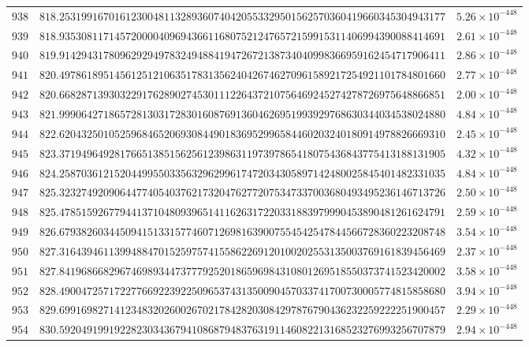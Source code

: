 \documentclass[12pt,reqno]{amsart}
\theoremstyle{remark}
\begin{document}
\begin{longtable}{clc}
$938$ & $818.2531991670161230048113289360740420553329501562570360419660345304943177$ & $5.26\times 10^{-448}$ \\
$939$ & $818.9353081171457200004096943661168075212476572159915311406994390088414691$ & $2.61\times 10^{-448}$ \\
$940$ & $819.9142943178096292949783249488419472672138734040998366959162454717906411$ & $2.86\times 10^{-448}$ \\
$941$ & $820.4978618951456125121063517831356240426746270961589217254921101784801660$ & $2.77\times 10^{-448}$ \\
$942$ & $820.6682871393032291762890274530111226437210756469245274278726975648866851$ & $2.00\times 10^{-448}$ \\
$943$ & $821.9990642718657281303172830160876913604626951993929768630344034538024880$ & $4.84\times 10^{-448}$ \\
$944$ & $822.6204325010525968465206930844901836952996584460203240180914978826669310$ & $2.45\times 10^{-448}$ \\
$945$ & $823.3719496492817665138515625612398631197397865418075436843775413188131905$ & $4.32\times 10^{-448}$ \\
$946$ & $824.2587036121520449955033563296299617472034305897142480025845401482331035$ & $4.84\times 10^{-448}$ \\
$947$ & $825.3232749209064477405403762173204762772075347337003680493495236146713726$ & $2.50\times 10^{-448}$ \\
$948$ & $825.4785159267794413710480939651411626317220331883979990453890481261624791$ & $2.59\times 10^{-448}$ \\
$949$ & $826.6793826034450941513315774607126981639007554542547844566728360223208748$ & $3.54\times 10^{-448}$ \\
$950$ & $827.3164394611399488470152597574155862269120100202553135003769161839456469$ & $2.37\times 10^{-448}$ \\
$951$ & $827.8419686682967469893447377792520186596984310801269518550373741523420002$ & $3.58\times 10^{-448}$ \\
$952$ & $828.4900472571722776692239225096537431350090457033741700730005774815858680$ & $3.94\times 10^{-448}$ \\
$953$ & $829.6991698271412348320260026702178428203084297876790436232259222251900457$ & $2.29\times 10^{-448}$ \\
$954$ & $830.5920491991922823034367941086879483763191146082213168523276993256707879$ & $2.94\times 10^{-448}$ \\

\end{longtable}
\end{document}
